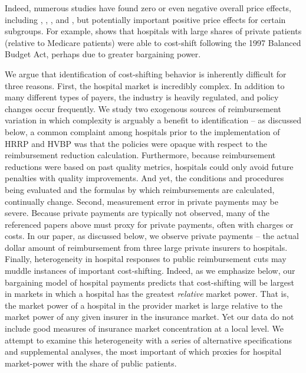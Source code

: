 \documentclass[12pt]{article}
\begin{document}
Indeed, numerous studies have found zero or even negative overall price effects, including \cite{dranove2008impact}, \cite{wu2010}, \cite{frakt2014}, and \cite{dranove2017}, but potentially important positive price effects for certain subgroups.  For example, \cite{wu2010} shows that hospitals with large shares of private patients (relative to Medicare patients) were able to cost-shift following the 1997 Balanced Budget Act, perhaps due to greater bargaining power.

We argue that identification of cost-shifting behavior is inherently difficult for three reasons.  First, the hospital market is incredibly complex.  In addition to many different types of payers, the industry is heavily regulated, and policy changes occur frequently.  We study two exogenous sources of reimbursement variation in which complexity is arguably a benefit to identification -- as discussed below, a common complaint among hospitals prior to the implementation of HRRP and HVBP was that the policies were opaque with respect to the reimbursement reduction calculation.  Furthermore, because reimbursement reductions were based on past quality metrics, hospitals could only avoid future penalties with quality improvements.  And yet, the conditions and procedures being evaluated and the formulas by which reimbursements are calculated, continually change.  Second, measurement error in private payments may be severe.  Because private payments are typically not observed, many of the referenced papers above must proxy for private payments, often with charges or costs.  In our paper, as discussed below, we observe private payments -- the actual dollar amount of reimbursement from three large private insurers to hospitals.  Finally, heterogeneity in hospital responses to public reimbursement cuts may muddle instances of important cost-shifting.  Indeed, as we emphasize below, our bargaining model of hospital payments predicts that cost-shifting will be largest in markets in which a hospital has the greatest \textit{relative} market power.  That is, the market power of a hospital in the provider market is large relative to the market power of any given insurer in the insurance market.  Yet our data do not include good measures of insurance market concentration at a local level.  We attempt to examine this heterogeneity with a series of alternative specifications and supplemental analyses, the most important of which proxies for hospital market-power with the share of public patients.
\end{document}
